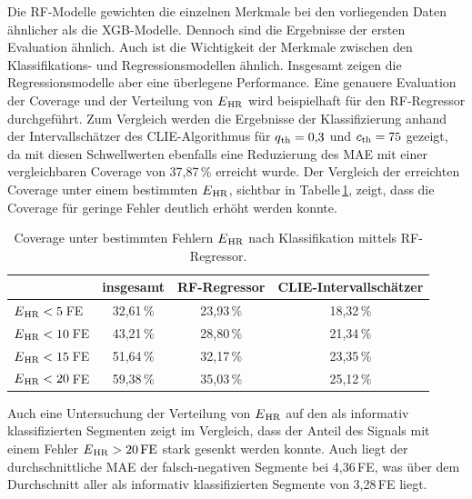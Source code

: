  Die \ac{RF}-Modelle gewichten die einzelnen Merkmale bei den vorliegenden Daten ähnlicher als die \ac{XGB}-Modelle. Dennoch sind die Ergebnisse der ersten Evaluation ähnlich. Auch ist die Wichtigkeit der Merkmale zwischen den Klassifikations- und Regressionsmodellen ähnlich. Insgesamt zeigen die Regressionsmodelle aber eine überlegene Performance. Eine genauere Evaluation der Coverage und der Verteilung von $E\textsubscript{HR}$ wird beispielhaft für den \ac{RF}-Regressor durchgeführt. Zum Vergleich werden die Ergebnisse der Klassifizierung anhand der Intervallschätzer des \ac{CLIE}-Algorithmus für $q\textsubscript{th}=0{,}3$ und $c\textsubscript{th}=75$ gezeigt, da mit diesen Schwellwerten ebenfalls eine Reduzierung des \ac{MAE} mit einer vergleichbaren Coverage von 37,87\,\% erreicht wurde. Der Vergleich der erreichten Coverage unter einem bestimmten $E\textsubscript{HR}$, sichtbar in Tabelle\,\ref{fig:own-coverage-default}, zeigt, dass die Coverage für geringe Fehler deutlich erhöht werden konnte. 
 
  \begin{table}[h]
 	\centering
  	\begin{tabular}{l || c | c | c}
 											& insgesamt 		& \ac{RF}-Regressor & \ac{CLIE}-Intervallschätzer\\\hline
 		$E\textsubscript{HR} < 5$\,\si{FE} 	&  32{,}61\,\% 	& 23,93\,\% 			& 18,32\,\%\\
 		$E\textsubscript{HR} < 10$\,\si{FE} 	&  43{,}21\,\% 	& 28,80\,\% 			& 21,34\,\%\\
 		$E\textsubscript{HR} < 15$\,\si{FE} 	&  51{,}64\,\% 	& 32,17\,\% 			& 23,35\,\%\\
 		$E\textsubscript{HR} < 20$\,\si{FE} 	&  59{,}38\,\% 	& 35,03\,\% 			& 25,12\,\%\\
 	\end{tabular}
 	\caption[Coverage unter bestimmten Fehlern $E\textsubscript{HR}$ nach Klassifikation mittels \ac{RF}-Regressor.]{Coverage unter bestimmten Fehlern $E\textsubscript{HR}$ nach Klassifikation mittels \ac{RF}-Regressor.}
 	\label{fig:own-coverage-default}
 \end{table}
 
 Auch eine Untersuchung der Verteilung von $E\textsubscript{HR}$ auf den als informativ klassifizierten Segmenten zeigt im Vergleich, dass der Anteil des Signals mit einem Fehler $E\textsubscript{HR} > 20\,\si{FE}$ stark gesenkt werden konnte. Auch liegt der durchschnittliche \ac{MAE} der falsch-negativen Segmente bei 4,36\,\si{FE}, was über dem Durchschnitt aller als informativ klassifizierten Segmente von 3,28\,\si{FE} liegt.
 

